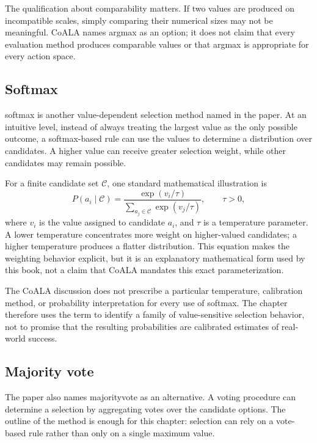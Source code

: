 The qualification about comparability matters. If two values are produced on incompatible scales, simply comparing their numerical sizes may not be meaningful. CoALA names argmax as an option; it does not claim that every evaluation method produces comparable values or that argmax is appropriate for every action space.

\subsection{Softmax}

\gls{softmax} is another value-dependent selection method named in the paper. At an intuitive level, instead of always treating the largest value as the only possible outcome, a softmax-based rule can use the values to determine a distribution over candidates. A higher value can receive greater selection weight, while other candidates may remain possible.

For a finite candidate set \(\mathcal C\), one standard mathematical illustration is
\begin{equation}
  P(a_i\mid\mathcal C)=
  \frac{\exp(v_i/\tau)}{\sum_{a_j\in\mathcal C}\exp(v_j/\tau)},
  \qquad \tau>0,
  \label{eq:ch7-softmax}
\end{equation}
where \(v_i\) is the value assigned to candidate \(a_i\), and \(\tau\) is a temperature parameter. A lower temperature concentrates more weight on higher-valued candidates; a higher temperature produces a flatter distribution. This equation makes the weighting behavior explicit, but it is an explanatory mathematical form used by this book, not a claim that CoALA mandates this exact parameterization.

The CoALA discussion does not prescribe a particular temperature, calibration method, or probability interpretation for every use of softmax. The chapter therefore uses the term to identify a family of value-sensitive selection behavior, not to promise that the resulting probabilities are calibrated estimates of real-world success.

\subsection{Majority vote}

The paper also names \gls{majorityvote} as an alternative. A voting procedure can determine a selection by aggregating votes over the candidate options. The outline of the method is enough for this chapter: selection can rely on a vote-based rule rather than only on a single maximum value.

